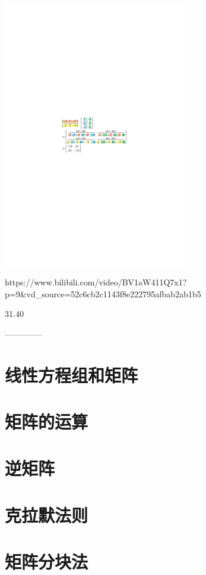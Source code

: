 \documentclass[UTF8]{ctexart}
\begin{document}
\begin{myEnvSample}
\includegraphics[width=0.6\textwidth]{img/0017.pdf}
\end{myEnvSample}



https://www.bilibili.com/video/BV1aW411Q7x1?p=9&vd_source=52c6cb2c1143f8e222795afbab2ab1b5

31.40

	--------------
	
	
	
	\part{线性方程组和矩阵}
	
	
	\part{矩阵的运算}
	
	\part{逆矩阵}
	
	\part{克拉默法则}
	
	\part{矩阵分块法}
	
\end{document}
